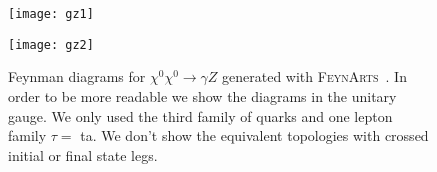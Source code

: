 %

\begin{figure}[h]
\centering
\texttt{[image: gz1]}
\end{figure}
%
\begin{figure}[h]
\centering
\texttt{[image: gz2]}
\caption{Feynman diagrams for $\chi^0\chi^0 \to\gamma Z$ generated with \textsc{FeynArts}~\cite{Hahn:2000kx}. In order to be more readable we show the diagrams in the unitary gauge. We only used the third family of quarks and one lepton family $\tau= $ ta.  We don't show the equivalent topologies with crossed initial or final state legs.}
\label{fig:2F-to-GZ}
\end{figure}





